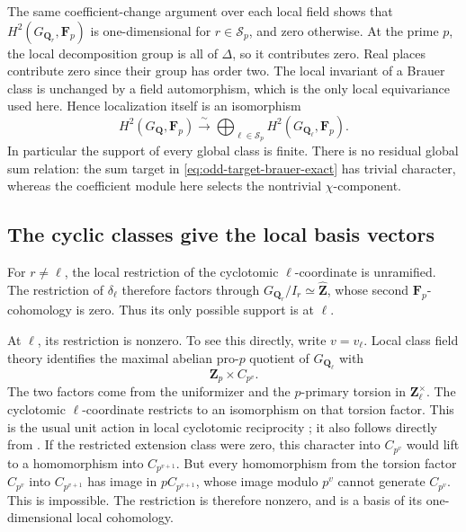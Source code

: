 The same coefficient-change argument over each local
field shows that \(H^2(G_{\mathbf Q_r},\mathbf F_p)\)
is one-dimensional for \(r\in\mathcal S_p\), and
zero otherwise.  At the prime \(p\), the local
decomposition group is all of \(\Delta\), so it
contributes zero.  Real places contribute zero since
their group has order two.  The local invariant
of a Brauer class is unchanged by a field
automorphism, which is the only local equivariance
used here.  Hence localization itself is an
isomorphism
\begin{equation}\label{eq:odd-target-localization-isomorphism}
 H^2(G_{\mathbf Q},\mathbf F_p)
          \xrightarrow{\ \sim\ }
       \bigoplus_{\ell\in\mathcal S_p}
                            H^2(G_{\mathbf Q_\ell},\mathbf F_p).
\end{equation}
In particular the support of every global class is
finite.  There is no residual global sum relation:
the sum target in \eqref{eq:odd-target-brauer-exact}
has trivial character, whereas the coefficient
module here selects the nontrivial \(\chi\)-component.

\subsection{The cyclic classes give the local basis vectors}

For \(r\ne\ell\), the local restriction of the
cyclotomic \(\ell\)-coordinate is unramified.
The restriction of \(\delta_\ell\) therefore factors
through \(G_{\mathbf Q_r}/I_r\simeq\widehat{\mathbf Z}\),
whose second \(\mathbf F_p\)-cohomology is zero.
Thus its only possible support is at \(\ell\).

At \(\ell\), its restriction is nonzero.  To see
this directly, write \(v=v_\ell\).  Local class
field theory identifies the maximal abelian
pro-\(p\) quotient of \(G_{\mathbf Q_\ell}\) with
\[
                             \mathbf Z_p\times C_{p^v}.
\]
The two factors come from the uniformizer and the
\(p\)-primary torsion in \(\mathbf Z_\ell^\times\).
The cyclotomic \(\ell\)-coordinate restricts to an
isomorphism on that torsion factor.  This is the
usual unit action in local cyclotomic reciprocity
\cite[I, Theorem~1.1, p.~20]{MilneCFT}; it also follows
directly from \cite[p.~380, formula~(2)]{LubinTate1965}.
If the restricted extension class were zero, this
character into \(C_{p^v}\) would lift to a
homomorphism into \(C_{p^{v+1}}\).
But every homomorphism from the torsion factor
\(C_{p^v}\) into \(C_{p^{v+1}}\) has image in
\(pC_{p^{v+1}}\), whose image modulo \(p^v\)
cannot generate \(C_{p^v}\).  This is impossible.
The restriction is therefore nonzero, and is a
basis of its one-dimensional local cohomology.

